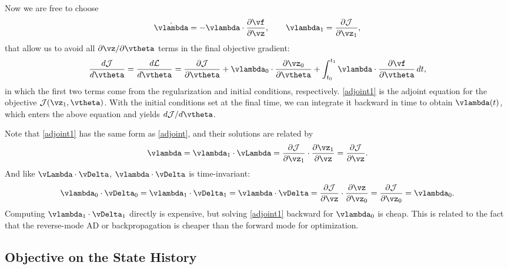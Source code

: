 \documentclass[modern, dvipsnames]{aastex631}
\renewcommand{\d}{d}
\newcommand{\p}{\partial}
\newcommand{\cJ}{\mathcal{J}}
\newcommand{\cL}{\mathcal{L}}
\begin{document}
Now we are free to choose
%
\begin{equation}
\dot\vlambda = - \vlambda \cdot \frac{\p\vf}{\p\vz},
\qquad
\vlambda_1 = \frac{\p\cJ}{\p\vz_1},
\label{adjoint1}
\end{equation}
%
that allow us to avoid all $\p\vz/\p\vtheta$ terms in the final
objective gradient:
%
\begin{equation}
\frac{\d\cJ}{\d\vtheta}
= \frac{\d\cL}{\d\vtheta}
= \frac{\p\cJ}{\p\vtheta} + \vlambda_0 \cdot \frac{\p\vz_0}{\p\vtheta}
+ \int_{t_0}^{t_1} \vlambda \cdot \frac{\p\vf}{\p\vtheta} \, \d t,
\end{equation}
%
in which the first two terms come from the regularization and initial
conditions, respectively.
\eqref{adjoint1} is the adjoint equation for the objective $\cJ(\vz_1,
\vtheta)$.
With the initial conditions set at the final time, we can integrate it
backward in time to obtain $\vlambda(t)$, which enters the above
equation and yields $\d\cJ / \d\vtheta$.

Note that \eqref{adjoint1} has the same form as \eqref{adjoint}, and
their solutions are related by
%
\begin{equation}
\vlambda = \vlambda_1 \cdot \vLambda
= \frac{\p\cJ}{\p\vz_1} \cdot \frac{\p\vz_1}{\p\vz}
= \frac{\p\cJ}{\p\vz}.
\end{equation}
%
And like $\vLambda \cdot \vDelta$, $\vlambda \cdot \vDelta$ is
time-invariant:
%
\begin{equation}
\vlambda_0 \cdot \vDelta_0
= \vlambda_1 \cdot \vDelta_1
= \vlambda \cdot \vDelta
= \frac{\p\cJ}{\p\vz} \cdot \frac{\p\vz}{\p\vz_0}
= \frac{\p\cJ}{\p\vz_0}
= \vlambda_0.
\end{equation}
%
Computing $\vlambda_1 \cdot \vDelta_1$ directly is expensive, but
solving \eqref{adjoint1} backward for $\vlambda_0$ is cheap.
This is related to the fact that the reverse-mode AD or backpropagation
is cheaper than the forward mode for optimization.


\vspace{1em}
\subsection{Objective on the State History}
\end{document}
